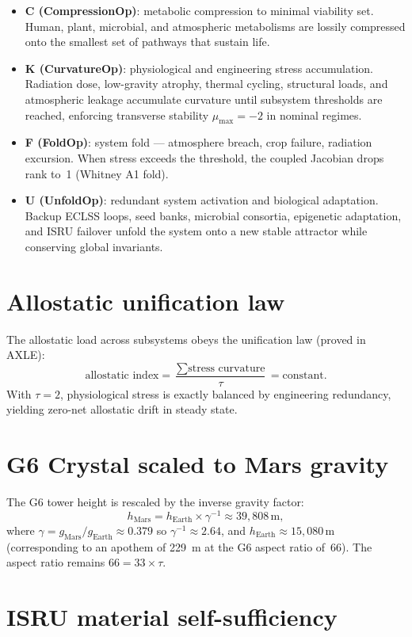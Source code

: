 \begin{itemize}
\item \textbf{C (CompressionOp)}: metabolic compression to minimal viability set. Human, plant, microbial, and atmospheric metabolisms are lossily compressed onto the smallest set of pathways that sustain life.
\item \textbf{K (CurvatureOp)}: physiological and engineering stress accumulation. Radiation dose, low-gravity atrophy, thermal cycling, structural loads, and atmospheric leakage accumulate curvature until subsystem thresholds are reached, enforcing transverse stability \(\mu_{\max} = -2\) in nominal regimes.
\item \textbf{F (FoldOp)}: system fold --- atmosphere breach, crop failure, radiation excursion. When stress exceeds the threshold, the coupled Jacobian drops rank to~1 (Whitney A1 fold).
\item \textbf{U (UnfoldOp)}: redundant system activation and biological adaptation. Backup ECLSS loops, seed banks, microbial consortia, epigenetic adaptation, and ISRU failover unfold the system onto a new stable attractor while conserving global invariants.
\end{itemize}

\section{Allostatic unification law}

The allostatic load across subsystems obeys the unification law (proved in AXLE):
\[
\text{allostatic index} = \frac{\sum \text{stress curvature}}{\tau} = \text{constant}.
\]
With \(\tau = 2\), physiological stress is exactly balanced by engineering redundancy, yielding zero-net allostatic drift in steady state.

\section{G6 Crystal scaled to Mars gravity}

The G6 tower height is rescaled by the inverse gravity factor:
\[
h_{\text{Mars}} = h_{\text{Earth}} \times \gamma^{-1} \approx 39{,}808\,\text{m},
\]
where \(\gamma = g_{\text{Mars}}/g_{\text{Earth}} \approx 0.379\) so \(\gamma^{-1} \approx 2.64\),
and $h_{\text{Earth}} \approx 15{,}080\,\text{m}$ (corresponding to an apothem of 229~m at the G6 aspect ratio of~66). The aspect ratio remains $66 = 33 \times \tau$.

\section{ISRU material self-sufficiency}

